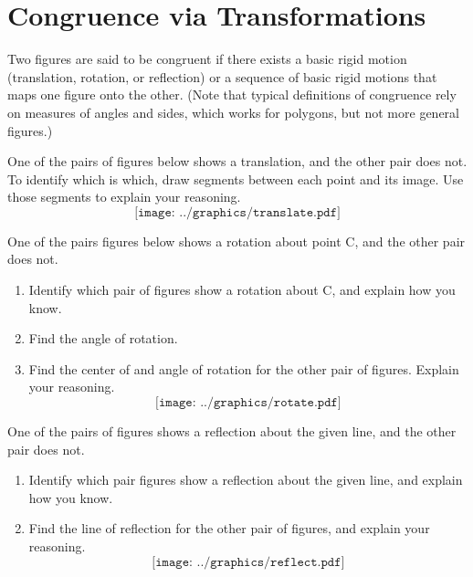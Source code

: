 \newpage

\section{Congruence via Transformations}
Two figures are said to be congruent if there exists a basic rigid motion (translation, 
rotation, or reflection) or a sequence of basic rigid motions that maps one figure onto 
the other.  (Note that typical definitions of congruence rely on measures of 
angles and sides, which works for polygons, but not more general figures.)  

\begin{prob}
One of the pairs of figures below shows a translation, and the other pair does not.  To identify which is which, draw segments between each point and its image.  Use those segments to explain your reasoning.
$$\texttt{[image: ../graphics/translate.pdf]}$$
\end{prob}

\newpage

\begin{prob}
One of the pairs figures below shows a rotation about point C, and the other pair does not. 
\begin{enumerate}
\item Identify which pair of figures show a rotation about C, and explain how you know.  
\item Find the angle of rotation.  
\item Find the center of and angle of rotation for the other pair of figures.  Explain your reasoning.  
$$\texttt{[image: ../graphics/rotate.pdf]}$$
\end{enumerate}
\end{prob}

\newpage
\begin{prob}
One of the pairs of figures shows a reflection about the given line, and the other pair does not.  
\begin{enumerate}
\item Identify which pair figures show a reflection about the given line, and explain how you know. 
\item Find the line of reflection for the other pair of figures, and explain your reasoning.  
$$\texttt{[image: ../graphics/reflect.pdf]}$$
\end{enumerate}
\end{prob}

